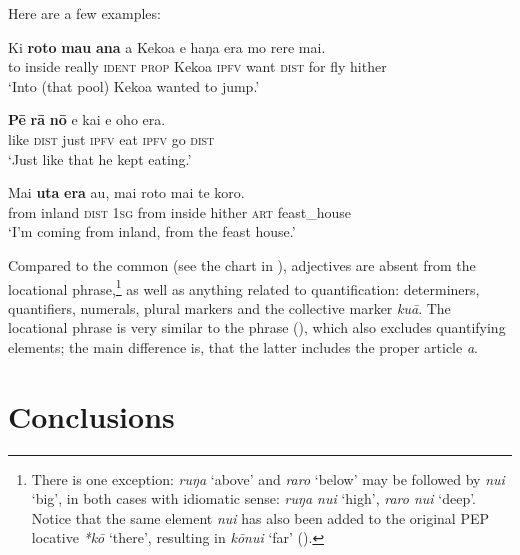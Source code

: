 Here are a few examples:

\ea\label{ex:3.179}
\gll Ki \textbf{roto} \textbf{mau} \textbf{{\ꞌ}ana} a Kekoa e haŋa era mo rere mai. \\
to inside really \textsc{ident} \textsc{prop} Kekoa \textsc{ipfv} want \textsc{dist} for fly hither \\

\glt 
‘Into (that pool) Kekoa wanted to jump.’ \textstyleExampleref{[R408.012]} 
\z

\ea\label{ex:3.180}
\gll \textbf{Pē} \textbf{rā} \textbf{nō} e kai e oho era.\\
like \textsc{dist} just \textsc{ipfv} eat \textsc{ipfv} go \textsc{dist}\\

\glt 
‘Just like that he kept eating.’ \textstyleExampleref{[R310.225]} 
\z

\ea\label{ex:3.181}
\gll Mai \textbf{{\ꞌ}uta} \textbf{era} au, mai roto mai te koro.\\
from inland \textsc{dist} \textsc{1sg} from inside hither \textsc{art} feast\_house\\

\glt
‘I’m coming from inland, from the feast house.’ \textstyleExampleref{[Mtx-7-20.034]}
\z

Compared to the common  (see the chart in ), adjectives are absent from the locational phrase,\footnote{\label{fn:158}There is one exception: \textit{ruŋa} ‘above’ and \textit{raro} ‘below’ may be followed by \textit{nui} ‘big’, in both cases with idiomatic sense: \textit{ruŋa nui} ‘high’, \textit{raro nui} ‘deep’. Notice that the same element \textit{nui} has also been added to the original PEP locative \textit{*kō} ‘there’, resulting in \textit{kōnui} ‘far’ ().} as well as anything related to quantification: determiners, quantifiers, numerals, plural markers and the collective marker \textit{kuā}. The locational phrase is very similar to the  phrase (), which also excludes quantifying elements; the main difference is, that the latter includes the proper article \textit{a}.
\section{Conclusions}\label{sec:3.7}

